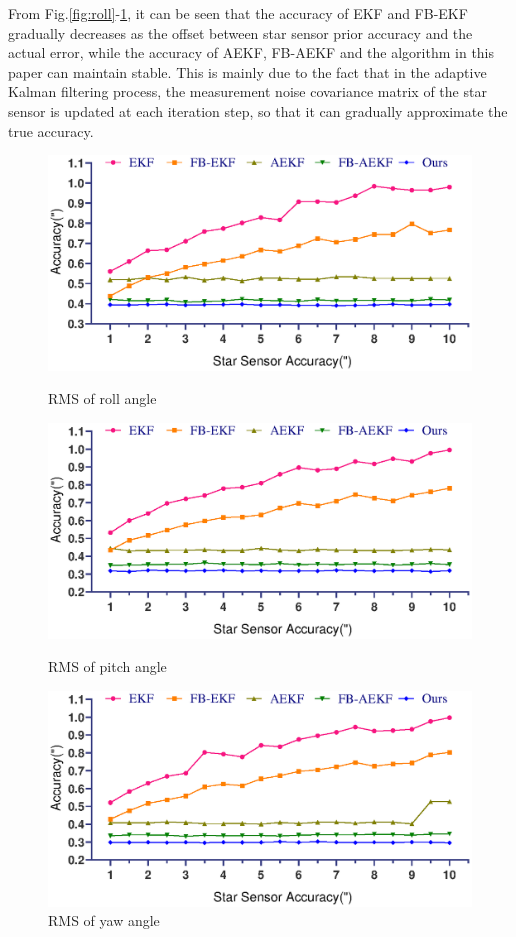 \documentclass{article}
\begin{document}
	
	From Fig.\ref{fig:roll}-\ref{fig:yaw}, it can be seen that the accuracy of EKF and FB-EKF gradually decreases as the offset between star sensor prior accuracy and the actual error, while the accuracy of AEKF, FB-AEKF and the algorithm in this paper can maintain stable. This is mainly due to the fact that in the adaptive Kalman filtering process, the measurement noise covariance matrix of the star sensor is updated at each iteration step, so that it can gradually approximate the true accuracy.
	
	\begin{figure}
		\begin{minipage}[t]{0.5\linewidth}
			\centering
			\includegraphics[width=\linewidth]{pic/exp1-roll.eps}
			\caption{RMS of roll angle}
			\label{fig:roll}
		\end{minipage}%
		\begin{minipage}[t]{0.5\linewidth}
			\centering
			\includegraphics[width=\linewidth]{pic/exp1-pitch.eps}
			\caption{RMS of pitch angle}
			\label{fig:pitch}
		\end{minipage}
		
		\begin{minipage}[t]{\linewidth}
			\centering
			\includegraphics[width=0.5\linewidth]{pic/exp1-yaw.eps}
			\caption{RMS of yaw angle}
			\label{fig:yaw}
		\end{minipage}
	\end{figure}
	
\end{document}
